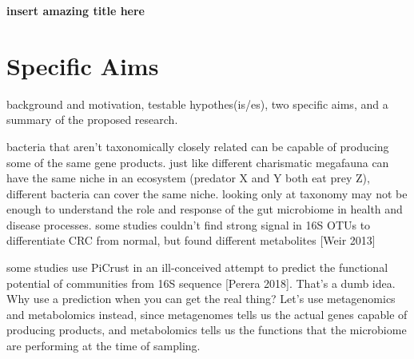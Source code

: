 \documentclass[12pt]{article}
\begin{document}
\sloppy
\begin{center}
    \large{
    \textbf{insert amazing title here}
    }
\end{center}
\section*{Specific Aims}

background and motivation, testable hypothes(is/es), two specific aims, and a summary of the proposed research. \cite{bikel_combining_2015}

bacteria that aren't taxonomically closely related can be capable of producing some of the same gene products.
just like different charismatic megafauna can have the same niche in an ecosystem (predator X and Y both eat prey Z), different bacteria can cover the same niche.
looking only at taxonomy may not be enough to understand the role and response of the gut microbiome in health and disease processes.
some studies couldn't find strong signal in 16S OTUs to differentiate CRC from normal, but found different metabolites [Weir 2013]

some studies use PiCrust in an ill-conceived attempt to predict the functional potential of communities from 16S sequence [Perera 2018].
That's a dumb idea. Why use a prediction when you can get the real thing?
Let's use metagenomics and metabolomics instead, since metagenomes tells us the actual genes capable of producing products, and metabolomics tells us the functions that the microbiome are performing at the time of sampling.
\end{document}
